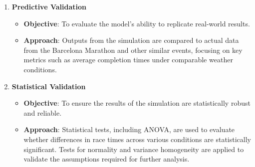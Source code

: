 \documentclass[conference]{IEEEtran}
\begin{document}
\begin{enumerate}
\begin{itemize}
    \end{itemize}
    \item \textbf{Predictive Validation}
        \begin{itemize}
        \item \textbf{Objective}: To evaluate the model’s ability to replicate real-world results.
        \item \textbf{Approach}: Outputs from the simulation are compared to actual data from the Barcelona Marathon and other similar events, focusing on key metrics such as average completion times under comparable weather conditions.
    \end{itemize}
    \item \textbf{Statistical Validation}
        \begin{itemize}
        \item \textbf{Objective}: To ensure the results of the simulation are statistically robust and reliable.
        \item \textbf{Approach}: Statistical tests, including ANOVA, are used to evaluate whether differences in race times across various conditions are statistically significant. Tests for normality and variance homogeneity are applied to validate the assumptions required for further analysis.
    \end{itemize}

\end{enumerate}
\end{document}
